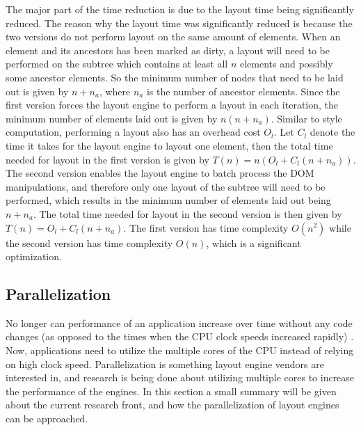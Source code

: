 \documentclass[a4paper,11pt]{kth-mag}
\begin{document}
        The major part of the time reduction is due to the layout time being significantly reduced.
        The reason why the layout time was significantly reduced is because the two versions do not perform layout on the same amount of elements.
        When an element and its ancestors has been marked as dirty, a layout will need to be performed on the subtree which contains at least all $n$ elements and possibly some ancestor elements.
        So the minimum number of nodes that need to be laid out is given by $n + n_{a}$, where $n_a$ is the number of ancestor elements.
        Since the first version forces the layout engine to perform a layout in each iteration, the minimum number of elements laid out is given by $n(n + n_a)$.
        Similar to style computation, performing a layout also has an overhead cost $O_{l}$.
        Let $C_{l}$ denote the time it takes for the layout engine to layout one element, then the total time needed for layout in the first version is given by $T(n) = n(O_{l} + C_{l}(n + n_a))$.
        The second version enables the layout engine to batch process the \gls{DOM} manipulations, and therefore only one layout of the subtree will need to be performed, which results in the minimum number of elements laid out being $n + n_a$.
        The total time needed for layout in the second version is then given by $T(n) = O_{l} + C_{l}(n + n_a)$.
        The first version has time complexity $O(n^2)$ while the second version has time complexity $O(n)$, which is a significant optimization.


      \subsection{Parallelization}\label{sec:parallel}
        No longer can performance of an application increase over time without any code changes (as opposed to the times when the \gls{CPU} clock speeds increased rapidly) \cite{parallelizing_the_web_browser}.
        Now, applications need to utilize the multiple cores of the \gls{CPU} instead of relying on high clock speed.
        Parallelization is something \gls{layout engine} vendors are interested in, and research is being done about utilizing multiple cores to increase the performance of the engines.
        In this section a small summary will be given about the current research front, and how the parallelization of layout engines can be approached.
\end{document}
